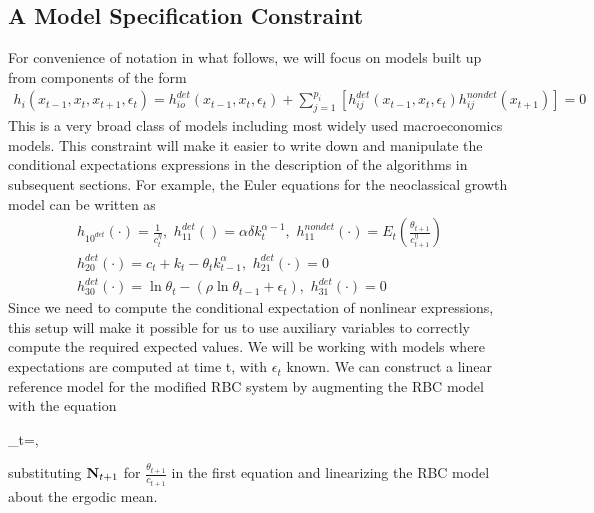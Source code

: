 \documentclass[12pt]{article}
\begin{document}
\subsection{A Model Specification Constraint}
\label{sec:convenient}



For convenience of notation in what follows, 
we will focus on models built up from components of the form
\begin{gather}
  h_i(x_{t-1},x_{t},x_{t+1},\epsilon_t)=h^{det}_{io}(x_{t-1},x_{t},\epsilon_t)+\sum_{j=1}^{p_i} [h^{det}_{ij}(x_{t-1},x_{t},\epsilon_t)h^{nondet}_{ij}(x_{t+1})]=0
\end{gather}
This is a very broad class of models including most widely used
macroeconomics models.  This constraint will make it easier to write
down and manipulate the conditional expectations expressions in the
description of the algorithms in subsequent sections.
For example, the Euler equations for the  neoclassical growth  model 
\label{sec:simple-rbc-model-ext} can be written as
\begin{gather}
h_{10^{det}}(\cdot)=\frac{1}{c_t^\eta},\,\,
h_{11}^{det}()=\alpha \delta k_{t}^{\alpha-1} ,\,\,
h_{11}^{nondet}(\cdot)=E_t \left (\frac{\theta_{t+1}}{c_{t+1}^\eta} \right )\\
h_{20}^{det}(\cdot)=c_t + k_t-\theta_tk_{t-1}^\alpha,\,\,
h_{21}^{det}(\cdot)=0\\
h_{30}^{det}(\cdot)=\ln \theta_t -(\rho \ln \theta_{t-1} + \epsilon_t),\,\,
h_{31}^{det}(\cdot)=0
\end{gather}
Since we   need to compute 
the conditional expectation of nonlinear expressions,  
this setup will make it possible for us to use auxiliary
variables to correctly compute the required expected values.
\label{simpRBCExample}
We will be working with models where expectations are computed at time t, with  $\epsilon_t$  known. 
We can construct a linear reference model for the modified RBC system
by  augmenting the RBC model with the equation 
\begin{tcolorbox}
  \rcpC_t=,
\end{tcolorbox}
\noindent
substituting ${\mathbf{N}}_{t+1}$ for $\frac{\theta_{t+1}}{c_{t+1}}$
in the first equation and 
 linearizing the RBC model about the ergodic mean.
\end{document}
